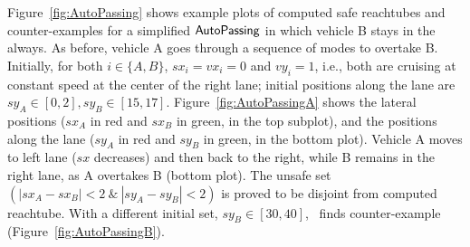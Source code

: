 Figure~\ref{fig:AutoPassing} shows example plots of computed safe
reachtubes and counter-examples for a simplified
${\operatorname{\mathsf{AutoPassing}}}$ in which vehicle B stays in the  always.
As before, vehicle A goes through a sequence of  modes %
to overtake B. 
Initially, for both $i \in \{A,B\}$, $sx_i = vx_i = 0$ and $vy_i = 1$, i.e., both are cruising at constant speed at the center of the right lane; initial positions along the lane are $sy_A\in [0,2], sy_B \in
[15,17]$.  Figure~\ref{fig:AutoPassingA} shows the lateral positions
($sx_A$ in red and $sx_B$ in green, in the top subplot), and the
positions along the lane ($sy_A$ in red and $sy_B$ in green, in the
bottom plot).
 Vehicle A moves to left lane ($sx$ decreases) and then
back to the right, while B remains in the right lane, as A overtakes
B (bottom plot).  The unsafe set $(|sx_A-sx_B|<2 \ \&\ |sy_A-sy_B|<2)$ is proved to be disjoint from computed reachtube.  With a different
initial set, $sy_B \in [30,40]$, \toolname\ finds counter-example (Figure~\ref{fig:AutoPassingB}).



